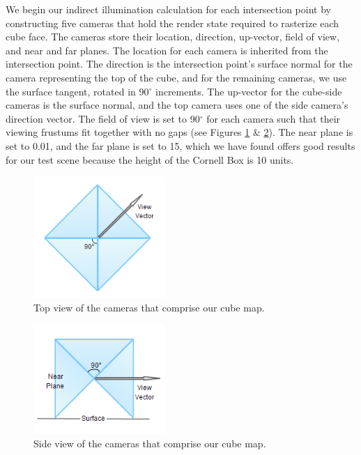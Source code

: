 We begin our indirect illumination calculation for each intersection point by constructing five cameras that hold the render state required to rasterize each cube face. The cameras store their location, direction, up-vector, field of view, and near and far planes. The location for each camera is inherited from the intersection point. The direction is the intersection point's surface normal for the camera representing the top of the cube, and for the remaining cameras, we use the surface tangent, rotated in 90$^\circ$ increments. The up-vector for the cube-side cameras is the surface normal, and the top camera uses one of the side camera's direction vector. The field of view is set to 90$^\circ$ for each camera such that their viewing frustums fit together with no gaps (see Figures \ref{fig:cubemap_top} \& \ref{fig:cubemap_side}). The near plane is set to 0.01, and the far plane is set to 15, which we have found offers good results for our test scene because the height of the Cornell Box is 10 units.

\begin{figure}[h!]
   \centering
   \includegraphics[width=50mm]{../img/cubemap_topview.png}
   \captionfonts
   \caption[Cubemap top-view]{Top view of the cameras that comprise our cube map.}
   \label{fig:cubemap_top}
\end{figure}

\begin{figure}[h!]
   \centering
   \includegraphics[width=50mm]{../img/cubemap_sideview.png}
   \captionfonts
   \caption[Cubemap side-view]{Side view of the cameras that comprise our cube map.}
   \label{fig:cubemap_side}
\end{figure}

